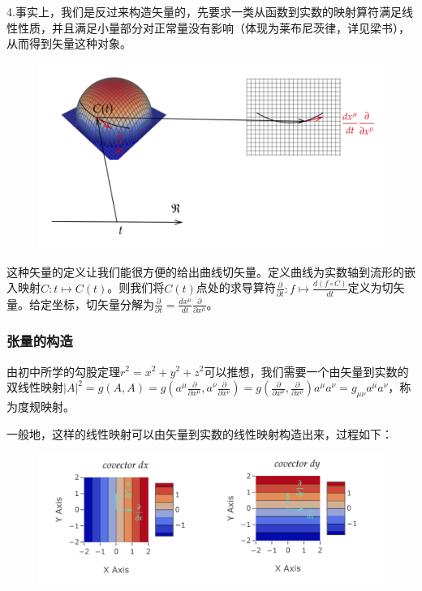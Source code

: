 \documentclass{article}
\begin{document}
4.事实上，我们是反过来构造矢量的，先要求一类从函数到实数的映射算符满足线性性质，并且满足小量部分对正常量没有影响（体现为莱布尼茨律，详见梁书），从而得到矢量这种对象。

\begin{figure}[htbp]
    \centering
    \includegraphics[scale=0.25]{4.png}
\end{figure}

这种矢量的定义让我们能很方便的给出曲线切矢量。定义曲线为实数轴到流形的嵌入映射$C:t\mapsto C(t)$。则我们将$C(t)$点处的求导算符$\frac{\partial}{\partial t}:f\mapsto \frac{d(f\circ C)}{dt}$定义为切矢量。给定坐标，切矢量分解为$\frac{\partial}{\partial t}=\frac{dx^\mu}{dt}\frac{\partial}{\partial x^\mu}$。

\subsubsection{张量的构造}
由初中所学的勾股定理$r^2=x^2+y^2+z^2$可以推想，我们需要一个由矢量到实数的双线性映射$|A|^2=g(A,A)=g(a^\mu \frac{\partial}{\partial x^\mu },a^\nu \frac{\partial}{\partial x^\nu })=g( \frac{\partial}{\partial x^\mu }, \frac{\partial}{\partial x^\nu})a^\mu a^\nu=g_{\mu \nu }a^\mu a^\nu $，称为度规映射。

一般地，这样的线性映射可以由矢量到实数的线性映射构造出来，过程如下：

\begin{figure}[htbp]
    \centering
    \includegraphics[scale=0.25]{6.png}
\end{figure}
\end{document}
